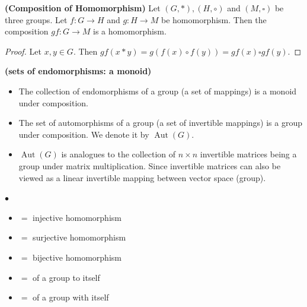 \documentclass{article}
\newcommand{\bfs}[1]{\textbf{({#1}) }}
\newcommand{\Aut}{\operatorname{Aut}}
\begin{document}
\begin{lema}{\bfs{Composition of Homomorphism}}
Let $(G, *),(H, \circ)$ and $(M, \square)$ be three groups. Let $f: G \rightarrow H$ and $g: H \rightarrow M$ be homomorphism. Then the composition $g f: G \rightarrow M$ is a homomorphism.
\end{lema}
\begin{proof}
Let $x, y \in G $. Then  $g f(x * y)=g(f(x) \circ f(y))=g f(x) \square g f(y)$.
\end{proof}
\begin{rema}{\bfs{sets of endomorphisms: a monoid}}\label{rm:endo_mono}
\begin{itemize}
    \item The collection of endomorphisms  of a group  (a set of mappings) is a monoid under composition. 
    \item The set of automorphisms of a group  (a set of invertible mappings) is a group under composition. We denote it by $\Aut(G)$.
    \item  $\Aut(G)$ is analogues to the collection of $n \times n$ invertible matrices being a group under matrix multiplication. Since invertible matrices  can also be viewed as a linear invertible mapping between vector space (group).
\end{itemize}

$\bullet$ 
\begin{itemize}
    \item {} $=$ injective homomorphism
\item {} $=$ surjective homomorphism
\item {} $=$ bijective homomorphism
\item {} $=$  of a group to itself
\item {} $=$  of a group with itself
\end{itemize}


\end{rema} 
\end{document}
